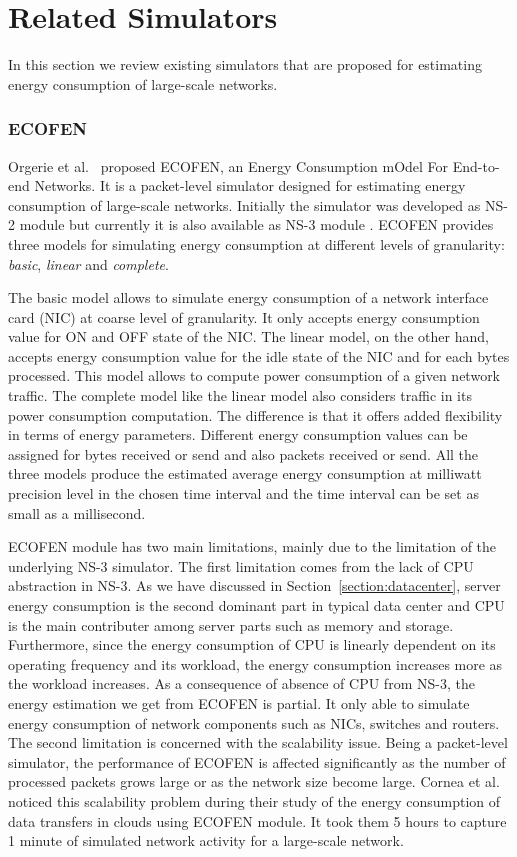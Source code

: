 \section{Related Simulators}
\label{section:relatedsimulator} 
In this section we review existing simulators that are proposed for estimating energy consumption of large-scale networks. 
\subsubsection{ECOFEN}
\label{subsection:ecofen} 
Orgerie et al.~\cite{DBLP:conf/wowmom/OrgerieLLL11} proposed ECOFEN, an Energy Consumption
mOdel For End-to-end Networks. It is a packet-level simulator designed for estimating energy consumption of large-scale networks. Initially the simulator was developed as NS-2 module but currently it is also available as NS-3 module \cite{DBLP:conf/cloudnet/CorneaOL14}. ECOFEN provides three models for simulating energy consumption at different levels of granularity: \emph{basic}, \emph{linear} and \emph{complete}.

The basic model allows to simulate energy consumption of a network interface card (NIC) at coarse level of granularity. It only accepts energy consumption value for ON and OFF state of the NIC. The linear model, on the other hand, accepts energy consumption value for the idle state of the NIC and for each bytes processed. This model allows to compute power consumption of a given network traffic. The complete model like the linear model also considers traffic in its power consumption computation. The difference is that it offers added flexibility in terms of energy parameters. Different energy consumption values can be assigned for bytes received or send and also packets received or send. All the three models produce the estimated average energy consumption at milliwatt precision level in the chosen time interval and the time interval can be set as small as a millisecond. 

ECOFEN module has two main limitations, mainly due to the limitation of the underlying NS-3 simulator. The first limitation comes from the lack of CPU abstraction in NS-3. As we have discussed in Section~\ref{section:datacenter}, server energy consumption is the second dominant part in typical data center and CPU is the main contributer among server parts such as memory and storage. Furthermore, since the energy consumption of CPU is linearly dependent on its operating frequency and its workload, the energy consumption increases more as the workload increases. As a consequence of absence of CPU from NS-3, the energy estimation we get from ECOFEN is partial. It only able to simulate energy consumption of network components such as NICs, switches and routers. The second limitation is concerned with the scalability issue. Being a packet-level simulator, the performance of ECOFEN is affected significantly as the number of processed packets grows large or as the network size become large. Cornea et al.~\cite{DBLP:conf/cloudnet/CorneaOL14} noticed this scalability problem during their study of the energy consumption of data transfers in clouds using ECOFEN module. It took them 5 hours to capture 1 minute of simulated network activity for a large-scale network. 


